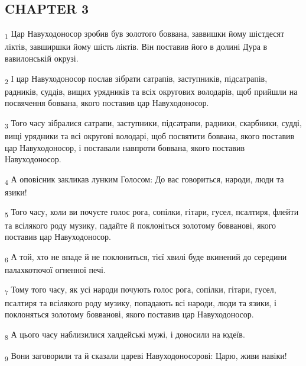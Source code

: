 \subsection{CHAPTER 3}
\begin{tcolorbox}
\textsubscript{1} Цар Навуходоносор зробив був золотого боввана, заввишки йому шістдесят ліктів, завширшки йому шість ліктів. Він поставив його в долині Дура в вавилонській окрузі.
\end{tcolorbox}
\begin{tcolorbox}
\textsubscript{2} І цар Навуходоносор послав зібрати сатрапів, заступників, підсатрапів, радників, суддів, вищих урядників та всіх округових володарів, щоб прийшли на посвячення боввана, якого поставив цар Навуходоносор.
\end{tcolorbox}
\begin{tcolorbox}
\textsubscript{3} Того часу зібралися сатрапи, заступники, підсатрапи, радники, скарбники, судді, вищі урядники та всі округові володарі, щоб посвятити боввана, якого поставив цар Навуходоносор, і поставали навпроти боввана, якого поставив Навуходоносор.
\end{tcolorbox}
\begin{tcolorbox}
\textsubscript{4} А оповісник закликав лунким Голосом: До вас говориться, народи, люди та язики!
\end{tcolorbox}
\begin{tcolorbox}
\textsubscript{5} Того часу, коли ви почуєте голос рога, сопілки, гітари, гусел, псалтиря, флейти та всілякого роду музику, падайте й поклоніться золотому бовванові, якого поставив цар Навуходоносор.
\end{tcolorbox}
\begin{tcolorbox}
\textsubscript{6} А той, хто не впаде й не поклониться, тієї хвилі буде вкинений до середини палахкотючої огненної печі.
\end{tcolorbox}
\begin{tcolorbox}
\textsubscript{7} Тому того часу, як усі народи почують голос рога, сопілки, гітари, гусел, псалтиря та всілякого роду музику, попадають всі народи, люди та язики, і поклоняться золотому бовванові, якого поставив цар Навуходоносор.
\end{tcolorbox}
\begin{tcolorbox}
\textsubscript{8} А цього часу наблизилися халдейські мужі, і доносили на юдеїв.
\end{tcolorbox}
\begin{tcolorbox}
\textsubscript{9} Вони заговорили та й сказали цареві Навуходоносорові: Царю, живи навіки!
\end{tcolorbox}
